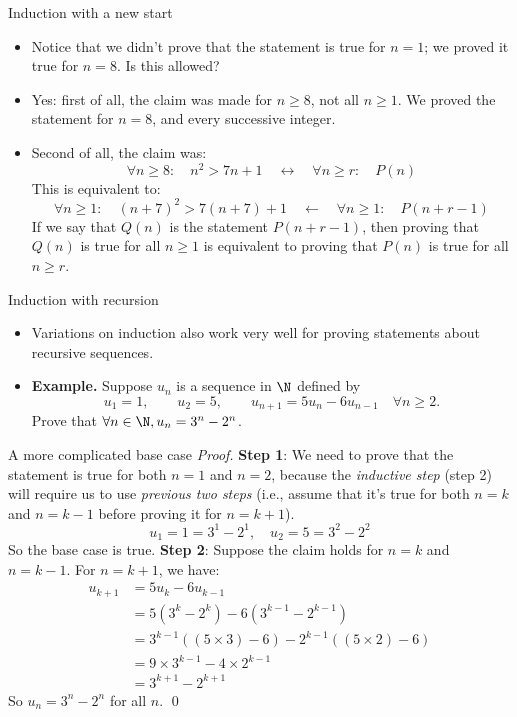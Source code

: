 \documentclass[11pt,aspectratio=1610,handout]{beamer}
\begin{document}
\begin{frame}{Induction with a new start}
	\begin{itemize}
		\item Notice that we didn't prove that the statement is true for $n=1$; we proved it true for $n=8$. Is this allowed? \p
		\item Yes: first of all, the claim was made for $n \geq 8$, not all $n \geq 1$. We proved the statement for $n=8$, and every successive integer. \p
		\item Second of all, the claim was:
		\[
		\forall n \geq 8: \quad n^2 > 7n+1 \quad \longleftrightarrow \quad \forall n \geq r: \quad P(n)
		\]\p 
		This is equivalent to: 
		\[
		\forall n \geq 1: \quad (n+7)^2 > 7(n+7)+1 \quad \longleftarrow \quad \forall n \geq 1: \quad P(n+r-1)
		\] \p
		If we say that $Q(n)$ is the statement $P(n+r-1)$, then proving that $Q(n)$ is true for all $n\geq 1$ is equivalent to proving that $P(n)$ is true for all $n \geq r$. 
	\end{itemize}
\end{frame}

\begin{frame}{Induction with recursion}
	\begin{itemize}
		\item Variations on induction also work very well for proving statements about recursive sequences. \p
		\item \textbf{Example.} Suppose $u_n$ is a sequence in $\N$ defined by 
		\[
		u_1 = 1, \qquad u_2 = 5, \qquad u_{n+1} = 5u_n - 6u_{n-1} \quad \forall n \geq 2. 
		\] \p
		Prove that $\forall n \in \N, u_n = 3^n - 2^n$. 
	\end{itemize}
	\vspace{3in}
\end{frame}

\begin{frame}{A more complicated base case}
	\emph{Proof.} \p \textbf{Step 1}: We need to prove that the statement is true for both $n=1$ and $n=2$, because the \emph{inductive step} (step 2) will require us to use \emph{previous two steps} (i.e., assume that it's true for both $n=k$ and $n=k-1$ before proving it for $n=k+1$).
	\[
	u_1 = 1 = 3^1 - 2^1, \quad u_2 = 5 = 3^2 - 2^2
	\] \p
	So the base case is true. \p
	\newline \textbf{Step 2}: Suppose the claim holds for $n=k$ and $n=k-1$. For $n=k+1$, we have: \p
	\begin{align*}
	u_{k+1} &= 5u_k - 6u_{k-1} \\
	&= 5(3^k - 2^k) - 6(3^{k-1} - 2^{k-1}) \\
	&= 3^{k-1}((5\times 3)-6) - 2^{k-1}((5\times 2) - 6) \\
	&= 9 \times 3^{k-1} - 4 \times 2^{k-1} \\
	&= 3^{k+1} - 2^{k+1}
	\end{align*}\p
	So $u_n = 3^n - 2^n$ for all $n$. \qed
\end{frame}
\end{document}
